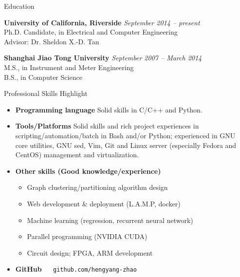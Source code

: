 \documentclass{resume} %
\begin{document}

\begin{rSection}{Education}

{\bf University of California, Riverside} \hfill {\em September 2014 -- present} \\
Ph.D. Candidate, in Electrical and Computer Engineering \\
Advisor: Dr. Sheldon X.-D. Tan

{\bf Shanghai Jiao Tong University} \hfill {\em September 2007 -- March 2014} \\
M.S., in Instrument and Meter Engineering\\
B.S., in Computer Science

\end{rSection}

\begin{rSection}{Professional Skills Highlight}

    \begin{itemize}

        \item \textbf{Programming language} Solid skills in C/C++ and Python.

        \item \textbf{Tools/Platforms} Solid skills and rich project
            experiences in scripting/automation/batch in Bash and/or Python;
            experienced in GNU core utilities, GNU sed, Vim, Git and Linux
            server (especially Fedora and CentOS) management and
            virtualization.

        \item \textbf{Other skills (Good knowledge/experience)}

            \begin{itemize}
                \item Graph clustering/partitioning algorithm design
                \item Web development \& deployment (L.A.M.P, docker)
                \item Machine learning (regression, recurrent neural network)
                \item Parallel programming (NVIDIA CUDA)
                \item Circuit design; FPGA, ARM development
            \end{itemize}

        \item \textbf{GitHub} $\quad$ \texttt{github.com/hengyang-zhao}

    \end{itemize}

\end{rSection}
\end{document}
